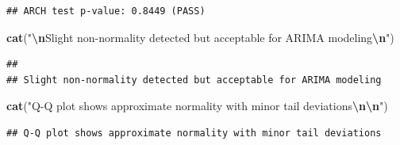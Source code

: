 \documentclass[
]{article}
\newenvironment{Shaded}{\begin{snugshade}}{\end{snugshade}}
\newcommand{\AttributeTok}[1]{\textcolor[rgb]{0.13,0.29,0.53}{#1}}
\newcommand{\CommentTok}[1]{\textcolor[rgb]{0.56,0.35,0.01}{\textit{#1}}}
\newcommand{\DecValTok}[1]{\textcolor[rgb]{0.00,0.00,0.81}{#1}}
\newcommand{\FloatTok}[1]{\textcolor[rgb]{0.00,0.00,0.81}{#1}}
\newcommand{\FunctionTok}[1]{\textcolor[rgb]{0.13,0.29,0.53}{\textbf{#1}}}
\newcommand{\NormalTok}[1]{#1}
\newcommand{\OtherTok}[1]{\textcolor[rgb]{0.56,0.35,0.01}{#1}}
\newcommand{\SpecialCharTok}[1]{\textcolor[rgb]{0.81,0.36,0.00}{\textbf{#1}}}
\newcommand{\StringTok}[1]{\textcolor[rgb]{0.31,0.60,0.02}{#1}}
\begin{document}
\begin{verbatim}
## ARCH test p-value: 0.8449 (PASS)
\end{verbatim}

\begin{Shaded}
\begin{Highlighting}[]
\FunctionTok{cat}\NormalTok{(}\StringTok{"}\SpecialCharTok{\textbackslash{}n}\StringTok{Slight non{-}normality detected but acceptable for ARIMA modeling}\SpecialCharTok{\textbackslash{}n}\StringTok{"}\NormalTok{)}
\end{Highlighting}
\end{Shaded}

\begin{verbatim}
## 
## Slight non-normality detected but acceptable for ARIMA modeling
\end{verbatim}

\begin{Shaded}
\begin{Highlighting}[]
\FunctionTok{cat}\NormalTok{(}\StringTok{"Q{-}Q plot shows approximate normality with minor tail deviations}\SpecialCharTok{\textbackslash{}n\textbackslash{}n}\StringTok{"}\NormalTok{)}
\end{Highlighting}
\end{Shaded}

\begin{verbatim}
## Q-Q plot shows approximate normality with minor tail deviations
\end{verbatim}

\begin{Shaded}
\end{Shaded}
\end{document}
